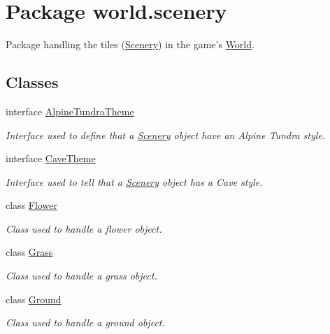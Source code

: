\hypertarget{namespaceworld_1_1scenery}{\section{Package world.\-scenery}
\label{namespaceworld_1_1scenery}
}


Package handling the tiles (\hyperlink{classworld_1_1scenery_1_1_scenery}{Scenery}) in the game's \hyperlink{classworld_1_1_world}{World}.  


\subsection*{Classes}
\begin{DoxyCompactItemize}
\item 
interface \hyperlink{interfaceworld_1_1scenery_1_1_alpine_tundra_theme}{Alpine\-Tundra\-Theme}
\begin{DoxyCompactList}\small\item\em Interface used to define that a \hyperlink{classworld_1_1scenery_1_1_scenery}{Scenery} object have an Alpine Tundra style. \end{DoxyCompactList}\item 
interface \hyperlink{interfaceworld_1_1scenery_1_1_cave_theme}{Cave\-Theme}
\begin{DoxyCompactList}\small\item\em Interface used to tell that a \hyperlink{classworld_1_1scenery_1_1_scenery}{Scenery} object has a Cave style. \end{DoxyCompactList}\item 
class \hyperlink{classworld_1_1scenery_1_1_flower}{Flower}
\begin{DoxyCompactList}\small\item\em Class used to handle a flower object. \end{DoxyCompactList}\item 
class \hyperlink{classworld_1_1scenery_1_1_grass}{Grass}
\begin{DoxyCompactList}\small\item\em Class used to handle a grass object. \end{DoxyCompactList}\item 
class \hyperlink{classworld_1_1scenery_1_1_ground}{Ground}
\begin{DoxyCompactList}\small\item\em Class used to handle a ground object. \end{DoxyCompactList}\item 

\end{DoxyCompactItemize}
